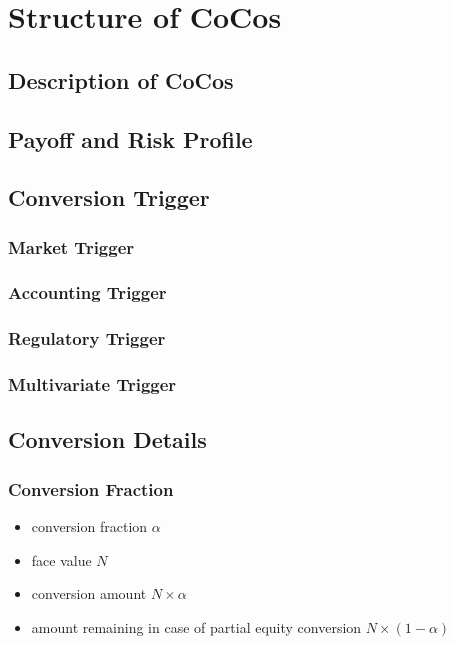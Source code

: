 \chapter{Structure of CoCos}

\section{Description of CoCos}

\section{Payoff and Risk Profile}

\section{Conversion Trigger}

\subsection{Market Trigger}

\subsection{Accounting Trigger}

\subsection{Regulatory Trigger}

\subsection{Multivariate Trigger}

\section{Conversion Details}

\subsection{Conversion Fraction}

\begin{itemize}
    \item conversion fraction $\alpha$
    \item face value $N$
    \item conversion amount $N \times \alpha$
    \item amount remaining in case of partial equity conversion $N \times (1-\alpha)$
\end{itemize}


